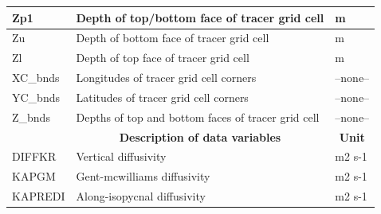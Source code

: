 \begin{longtable}{|m{}|m{}|m{}|}
Zp1 &Depth of top/bottom face of tracer grid cell &m  \\ \hline
Zu &Depth of bottom face of tracer grid cell &m  \\ \hline
Zl &Depth of top face of tracer grid cell &m  \\ \hline
XC\_bnds &Longitudes of tracer grid cell corners &--none--  \\ \hline
YC\_bnds &Latitudes of tracer grid cell corners &--none--  \\ \hline
Z\_bnds &Depths of top and bottom faces of tracer grid cell &--none--  \\ \hline
\rowcolor{lightgray} \multicolumn{1}{|c|}{\textbf{Variables}} & \multicolumn{1}{|c|}{\textbf{Description of data variables}} &  \multicolumn{1}{|c|}{\textbf{Unit}}\\ \hline
DIFFKR &Vertical diffusivity &m2 s-1  \\ \hline
KAPGM &Gent-mcwilliams diffusivity &m2 s-1  \\ \hline
KAPREDI &Along-isopycnal diffusivity &m2 s-1  \\ \hline
\end{longtable}

\newp
\pagebreak
